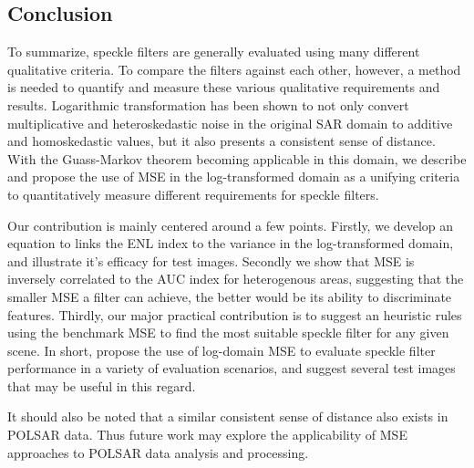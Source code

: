 \documentclass[journal]{IEEEtran}
\begin{document}
\subsection{Conclusion}

To summarize, speckle filters are generally evaluated using many different qualitative criteria.
To compare the filters against each other, however, a method is needed to quantify and measure these various qualitative requirements and results.
Logarithmic transformation has been shown to not only convert multiplicative and heteroskedastic noise in the original SAR domain to additive and homoskedastic values, but it also presents a consistent sense of distance.
With the Guass-Markov theorem becoming applicable in this domain, we describe and propose the use of MSE in the log-transformed domain as a unifying criteria to quantitatively measure different requirements for speckle filters.

Our contribution is mainly centered around a few points. 
Firstly, we develop an equation to links the ENL index to the variance in the log-transformed domain, and illustrate it's efficacy for test images.
Secondly we show that MSE is inversely correlated to the AUC index for heterogenous areas, suggesting that the smaller MSE a filter can achieve, the better would be its ability to discriminate features.
Thirdly, our major practical contribution is to suggest an heuristic rules using the benchmark MSE to find the most suitable speckle filter for any given scene. 
In short, propose the use of log-domain MSE to evaluate speckle filter performance in a variety of evaluation scenarios, and suggest several test images that may be useful in this regard.

It should also be noted that a similar consistent sense of distance also exists in POLSAR data. 
Thus future work may explore the applicability of MSE approaches to POLSAR data analysis and processing.



\end{document}
